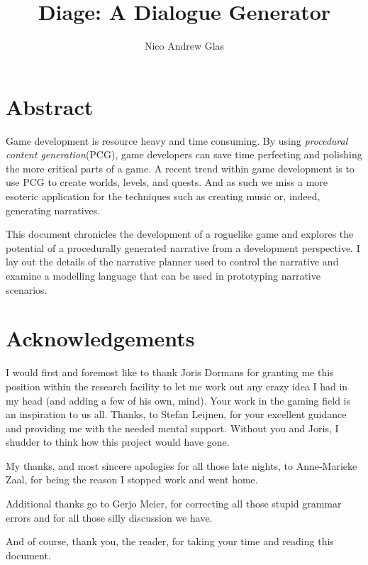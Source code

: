 \documentclass[12pt,a4paper,onecolumn,titlepage]{book}
\author{Nico Andrew Glas}
\title{Diage: A Dialogue Generator}
\begin{document}
\maketitle
\chapter*{Abstract}
Game development is resource heavy and time consuming.
By using \textit{procedural content generation}(PCG), game developers can save time perfecting and polishing the more critical parts of a game.
A recent trend within game development is to use PCG to create worlds, levels, and quests. And as such we miss a more esoteric application for the techniques such as creating music or, indeed, generating narratives.

This document chronicles the development of a roguelike game and explores the potential of a procedurally generated narrative from a development perspective.
I lay out the details of the narrative planner used to control the narrative and examine a modelling language that can be used in prototyping narrative scenarios.

\chapter*{Acknowledgements}
I would first and foremost like to thank Joris Dormans for granting me this position within the research facility to let me work out any crazy idea I had in my head (and adding a few of his own, mind). 
Your work in the gaming field is an inspiration to us all.
Thanks, to Stefan Leijnen, for your excellent guidance and providing me with the needed mental support.
Without you and Joris, I shudder to think how this project would have gone.

My thanks, and most sincere apologies for all those late nights, to Anne-Marieke Zaal, for being the reason I stopped work and went home.

Additional thanks go to Gerjo Meier, for correcting all those stupid grammar errors and for all those silly discussion we have.

And of course, thank you, the reader, for taking your time and reading this document.

\tableofcontents









\end{document}
